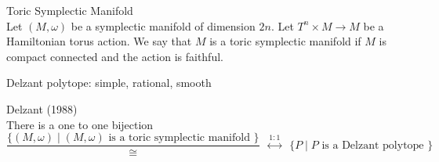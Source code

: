 \documentclass[a4paper]{article}
\begin{document}
\begin{defn}{Toric Symplectic Manifold}{}\\
Let $(M,\omega)$ be a symplectic manifold of dimension $2n$. Let $T^n\times M\to M$ be a Hamiltonian torus action. We say that $M$ is a toric symplectic manifold if $M$ is compact connected and the action is faithful. 
\end{defn}

Delzant polytope: simple, rational, smooth

\begin{thm}{Delzant (1988)}{}\\
There is a one to one bijection $$\frac{\{(M,\omega)\;|\;(M,\omega)\text{ is a toric symplectic manifold }\}}{\cong}\;\;\overset{1:1}{\leftrightarrow}\;\;\{P\;|\;P\text{ is a Delzant polytope }\}$$
\end{thm}
\end{document}
